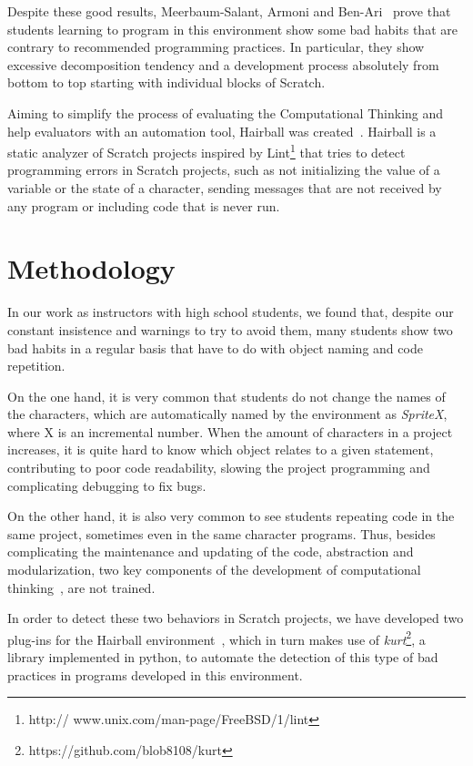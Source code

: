 \documentclass[conference]{format/IEEEtran}
\begin{document}
Despite these good results, Meerbaum-Salant, Armoni and Ben-Ari~\cite{meerbaum2011habits} prove that students learning to program in this environment show some bad habits that are contrary to recommended programming practices. In particular, they show excessive decomposition tendency and a development process absolutely from bottom to top starting with individual blocks of Scratch.

 Aiming to simplify the process of evaluating the Computational Thinking and help evaluators with an automation tool, Hairball was created~\cite{boe2013hairball}. Hairball is a static analyzer of Scratch projects inspired by Lint\footnote{http:// www.unix.com/man-page/FreeBSD/1/lint} that tries to detect programming errors in Scratch projects, such as not initializing the value of a variable or the state of a character, sending messages that are not received by any program or including code that is never run.

\section{Methodology}
\label{sec:methodology}

In our work as instructors with high school students, we found that, despite our constant insistence and warnings to try to avoid them, many students show two bad habits in a regular basis that have to do with object naming and code repetition.


On the one hand, it is very common that students do not change the names of the characters, which are automatically named by the environment as \textit{SpriteX}, where X is an incremental number. When the amount of characters in a project increases, it is quite hard to know which object relates to a given statement, contributing to poor code readability, slowing the project programming and complicating debugging to fix bugs.

On the other hand, it is also very common to see students repeating code in the same project, sometimes even in the same character programs. Thus, besides complicating the maintenance and updating of the code, abstraction and modularization, two key components of the development of computational thinking~\cite{wing2008computational}, are not trained.

In order to detect these two behaviors in Scratch projects, we have developed two plug-ins for the Hairball environment~\cite{boe2013hairball}, which in turn makes use of \textit{kurt}\footnote{https://github.com/blob8108/kurt}, a library implemented in python, to automate the detection of this type of bad practices in programs developed in this environment.
\end{document}
